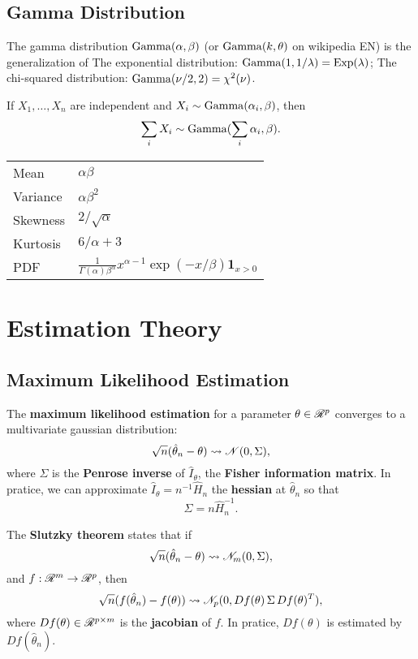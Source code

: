 \subsection{Gamma Distribution}
\begin{outline}
  \1 The gamma distribution $\operatorname{Gamma}(\alpha,\beta)$ (or $\operatorname{Gamma}(k,\theta)$ on
  wikipedia EN) is the generalization of 
  \2 The exponential distribution:
  $\operatorname{Gamma}(1,1/\lambda) = \operatorname{Exp}(\lambda)$; 
  \2 The chi-squared distribution:
  $\operatorname{Gamma}(\nu/2,2) = \chi^2(\nu)$.

  \1 If $X_1,\dots,X_n$ are independent and $X_i\sim\operatorname{Gamma}(\alpha_i,\beta)$, then
  \[
    \sum_iX_i \sim \operatorname{Gamma}(\sum_i \alpha_i,\beta).
  \]

  \1 
  \begin{tabular}{ll}
    \toprule
    Mean & $\alpha\beta$\\
    Variance & $\alpha\beta^2$\\
    Skewness & $2/\sqrt{\alpha}$\\
    Kurtosis & $6/\alpha + 3$\\
    PDF & $\displaystyle \frac{1}{\Gamma(\alpha)\beta^\alpha} x^{\alpha-1} \exp(-x/\beta)
          \bm 1_{x>0}$\\
    \bottomrule
  \end{tabular}
\end{outline}


\section{Estimation Theory}

\subsection{Maximum Likelihood Estimation}
\begin{outline}
  \1 The \textbf{maximum likelihood estimation} for a parameter $\theta \in \mathscr{R}^p$
  converges to a multivariate gaussian distribution:
  \[
    \sqrt{n}(\hat\theta_n - \theta) \leadsto \mathscr{N}(0,\Sigma),
  \]
  where $\Sigma$ is the \textbf{Penrose inverse} of $\hat I_\theta$, the \textbf{Fisher
    information matrix}. In pratice, we can approximate $\hat I_\theta = n^{-1}\hat H_n$
  the \textbf{hessian} at $\hat\theta_n$ so that
  \[
    \Sigma = n\hat H_n^{-1}.
  \]

  \1 The \textbf{Slutzky theorem} states that if 
  \[
    \sqrt{n}(\hat\theta_n - \theta) \leadsto \mathscr{N}_m(0,\Sigma),
  \]
  and $f:\mathscr{R}^m\to\mathscr{R}^p$, then 
  \[
    \sqrt{n}(f(\hat\theta_n) - f(\theta)) \leadsto \mathscr{N}_p(0,Df(\theta)\,\Sigma\,Df(\theta)^T),
  \]
  where $Df(\theta)\in\mathscr{R}^{p\times m}$ is the \textbf{jacobian} of $f$. In pratice,
  $Df(\theta)$ is estimated by $Df(\hat\theta_n)$.
\end{outline}



